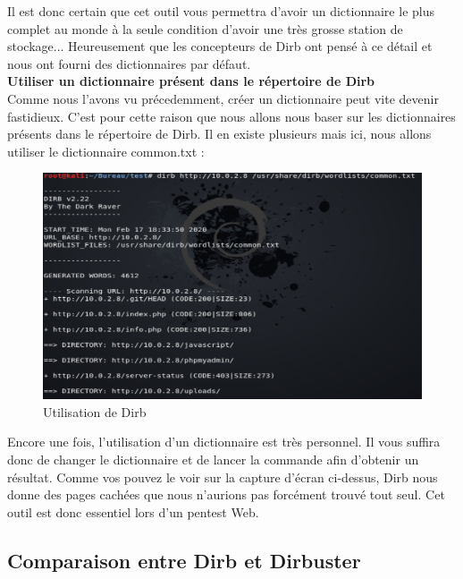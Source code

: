 Il est donc certain que cet outil vous permettra d'avoir un dictionnaire le plus complet au monde à la seule condition d'avoir une très grosse station de stockage... Heureusement que les concepteurs de Dirb ont pensé à ce détail et nous ont fourni des dictionnaires par défaut.\\

\noindent \textbf{Utiliser un dictionnaire présent dans le répertoire de Dirb}\\

Comme nous l'avons vu précedemment, créer un dictionnaire peut vite devenir fastidieux. C'est pour cette raison que nous allons nous baser sur les dictionnaires présents dans le répertoire de Dirb. Il en existe plusieurs mais ici, nous allons utiliser le dictionnaire common.txt :

\begin{figure}[htp!]
  \centering
  \setlength\figureheight{7cm}
  \setlength\figurewidth{9cm}
  \includegraphics[width=1\textwidth]{oui/images/Dirb/dirb.PNG}
  \caption{Utilisation de Dirb}
  \label{fig:courbe-tikz}
\end{figure}

Encore une fois, l'utilisation d'un dictionnaire est très personnel. Il vous suffira donc de changer le dictionnaire et de lancer la commande afin d'obtenir un résultat. Comme vos pouvez le voir sur la capture d'écran ci-dessus, Dirb nous donne des pages cachées que nous n'aurions pas forcément trouvé tout seul. Cet outil est donc essentiel lors d'un pentest Web.

\subsection{Comparaison entre Dirb et Dirbuster}

